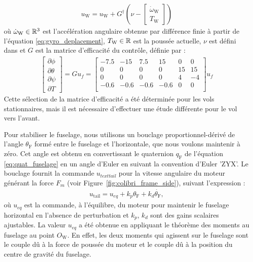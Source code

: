 \begin{align}
    u_{\text{W}} = u_{\text{W}} + G^{\dag} (\nu - \begin{bmatrix}
    \dot{\omega}_{\text{W}} \\
    T_{\text{W}}
    \end{bmatrix})
\end{align}
où  $ \dot{\omega}_{\text{W}} \in {\mathbb R}^{3}$ est l'accélération angulaire obtenue par différence finie à partir de l'équation \eqref{eq:gyro_deplacement},  $T_{\text{W}} \in {\mathbb R}$ est la poussée actuelle, $\nu$ est défini dans \cite[équation (4)]{smeurINDITail} et $G$ est la matrice d'efficacité du contrôle, définie par :
\begin{align*}
    \begin{bmatrix}
    \partial \phi \\
    \partial \theta \\
    \partial \psi \\
    \partial T
    \end{bmatrix}\! =\! G u_{f} \!=\!
    \begin{bmatrix}
    -7.5 & -15 & 7.5 & 15 & 0 & 0\\
    0 & 0 & 0 & 0 & 15 & 15 \\
    0 & 0 & 0 & 0 & 4 & -4 \\
    -0.6 & -0.6 & -0.6 & -0.6 & 0 & 0\\
    \end{bmatrix}
    u_{f}
\end{align*}
Cette sélection de la matrice d'efficacité a été déterminée pour les vols stationnaires, mais il est nécessaire d'effectuer une étude différente pour le vol vers l'avant.

Pour stabiliser le fuselage, nous utilisons un bouclage proportionnel-dérivé de l'angle $\theta_{\text{F}}$ formé entre le fuselage et l'horizontale, que nous voulons maintenir à zéro. Cet angle est obtenu en convertissant le quaternion $q_{\text{F}}$ de l'équation \eqref{eq:quat_fuselage} en un angle d'Euler en suivant la convention d'Euler 'ZYX'. Le bouclage fournit la commande $u_{text{tail}}$ pour la vitesse angulaire du moteur générant la force $F_{m}$ (voir Figure~\ref{fig:colibri_frame_side}), suivant l'expression :
\begin{align*}
    u_{\text{tail}} = u_{eq} + k_{p} \theta_{\text{F}} + k_{d} \dot{\theta_{\text{F}}},
\end{align*}
où $u_{eq}$ est la commande, à l'équilibre, du moteur pour maintenir le fuselage horizontal en l'absence de perturbation et $k_{p}$, $k_{d}$ sont des gains scalaires ajustables. La valeur $u_{eq}$ a été obtenue en appliquant le théorème des moments au fuselage au point $O_{\text{W}}$. En effet, les deux moments qui agissent sur le fuselage sont le couple dû à la force de poussée du moteur et le couple dû à la position du centre de gravité du fuselage.

